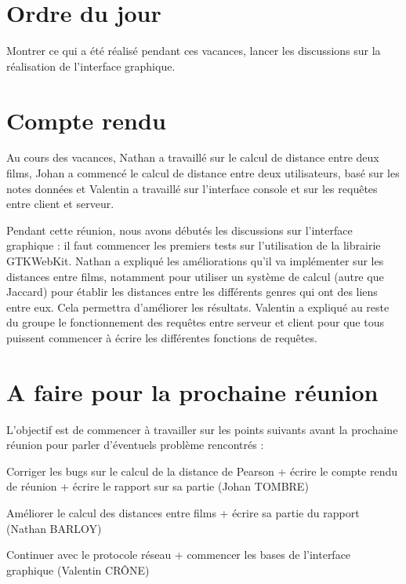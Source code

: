 \documentclass[11pt]{meetingmins}
\begin{document}
\maketitle

\section{Ordre du jour}
Montrer ce qui a été réalisé pendant ces vacances, lancer les discussions sur la réalisation de l'interface graphique.

\section {Compte rendu}
Au cours des vacances, Nathan a travaillé sur le calcul de distance entre deux films, Johan a commencé le calcul de distance entre deux utilisateurs, basé sur les notes données et Valentin a travaillé sur l'interface console et sur les requêtes entre client et serveur.\par
Pendant cette réunion, nous avons débutés les discussions sur l'interface graphique : il faut commencer les premiers tests sur l'utilisation de la librairie GTKWebKit. Nathan a expliqué les améliorations qu'il va implémenter sur les distances entre films, notamment pour utiliser un système de calcul (autre que Jaccard) pour établir les distances entre les différents genres qui ont des liens entre eux. Cela permettra d'améliorer les résultats.
Valentin a expliqué au reste du groupe le fonctionnement des requêtes entre serveur et client pour que tous puissent commencer à écrire les différentes fonctions de requêtes.

\section{A faire pour la prochaine réunion}
L'objectif est de commencer à travailler sur les points suivants avant la prochaine réunion pour parler d'éventuels problème rencontrés :
\begin{items}
	\item Corriger les bugs sur le calcul de la distance de Pearson + écrire le compte rendu de réunion + écrire le rapport sur sa partie (Johan TOMBRE)
	\item Améliorer le calcul des distances entre films + écrire sa partie du rapport (Nathan BARLOY)
	\item Continuer avec le protocole réseau + commencer les bases de l'interface graphique (Valentin CRÔNE)
\end{items}
\vspace{1cm}
\end{document}
